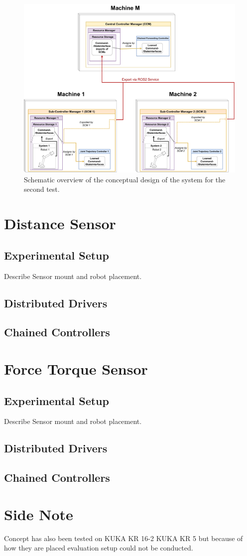 \begin{figure}[htbp]
	\centering
	\includegraphics[width=1\textwidth]{Figures/c6/test_scenario_2.drawio.pdf}
	\caption{Schematic overview of the conceptual design of the system for the second test.}
	\label{c6_fig_test_scenario_2}
\end{figure}
\section{Distance Sensor}
\subsection{Experimental Setup}
Describe Sensor mount and robot placement.
\subsection{Distributed Drivers}
\subsection{Chained Controllers}
\section{Force Torque Sensor}
\subsection{Experimental Setup}
Describe Sensor mount and robot placement.
\subsection{Distributed Drivers}
\subsection{Chained Controllers}
\section*{Side Note}
Concept has also been tested on KUKA KR 16-2 KUKA KR 5 but because of how they are placed evaluation setup could not be conducted.

